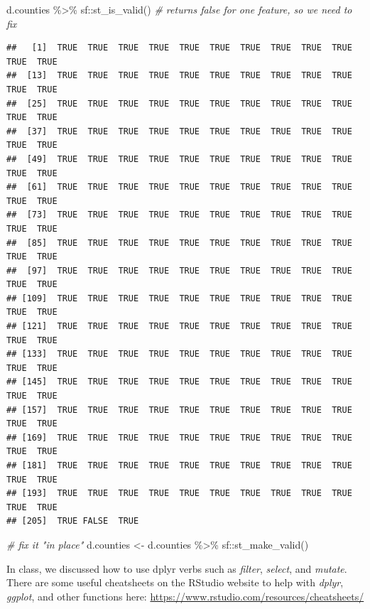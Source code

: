 \documentclass[]{article}
\newenvironment{Shaded}{\begin{snugshade}}{\end{snugshade}}
\newcommand{\CommentTok}[1]{\textcolor[rgb]{0.56,0.35,0.01}{\textit{#1}}}
\newcommand{\FunctionTok}[1]{\textcolor[rgb]{0.00,0.00,0.00}{#1}}
\newcommand{\NormalTok}[1]{#1}
\newcommand{\OtherTok}[1]{\textcolor[rgb]{0.56,0.35,0.01}{#1}}
\newcommand{\SpecialCharTok}[1]{\textcolor[rgb]{0.00,0.00,0.00}{#1}}
\begin{document}
\begin{Shaded}
\begin{Highlighting}[]
\NormalTok{d.counties }\SpecialCharTok{\%\textgreater{}\%}\NormalTok{ sf}\SpecialCharTok{::}\FunctionTok{st\_is\_valid}\NormalTok{() }\CommentTok{\# returns false for one feature, so we need to fix}
\end{Highlighting}
\end{Shaded}

\begin{verbatim}
##   [1]  TRUE  TRUE  TRUE  TRUE  TRUE  TRUE  TRUE  TRUE  TRUE  TRUE  TRUE  TRUE
##  [13]  TRUE  TRUE  TRUE  TRUE  TRUE  TRUE  TRUE  TRUE  TRUE  TRUE  TRUE  TRUE
##  [25]  TRUE  TRUE  TRUE  TRUE  TRUE  TRUE  TRUE  TRUE  TRUE  TRUE  TRUE  TRUE
##  [37]  TRUE  TRUE  TRUE  TRUE  TRUE  TRUE  TRUE  TRUE  TRUE  TRUE  TRUE  TRUE
##  [49]  TRUE  TRUE  TRUE  TRUE  TRUE  TRUE  TRUE  TRUE  TRUE  TRUE  TRUE  TRUE
##  [61]  TRUE  TRUE  TRUE  TRUE  TRUE  TRUE  TRUE  TRUE  TRUE  TRUE  TRUE  TRUE
##  [73]  TRUE  TRUE  TRUE  TRUE  TRUE  TRUE  TRUE  TRUE  TRUE  TRUE  TRUE  TRUE
##  [85]  TRUE  TRUE  TRUE  TRUE  TRUE  TRUE  TRUE  TRUE  TRUE  TRUE  TRUE  TRUE
##  [97]  TRUE  TRUE  TRUE  TRUE  TRUE  TRUE  TRUE  TRUE  TRUE  TRUE  TRUE  TRUE
## [109]  TRUE  TRUE  TRUE  TRUE  TRUE  TRUE  TRUE  TRUE  TRUE  TRUE  TRUE  TRUE
## [121]  TRUE  TRUE  TRUE  TRUE  TRUE  TRUE  TRUE  TRUE  TRUE  TRUE  TRUE  TRUE
## [133]  TRUE  TRUE  TRUE  TRUE  TRUE  TRUE  TRUE  TRUE  TRUE  TRUE  TRUE  TRUE
## [145]  TRUE  TRUE  TRUE  TRUE  TRUE  TRUE  TRUE  TRUE  TRUE  TRUE  TRUE  TRUE
## [157]  TRUE  TRUE  TRUE  TRUE  TRUE  TRUE  TRUE  TRUE  TRUE  TRUE  TRUE  TRUE
## [169]  TRUE  TRUE  TRUE  TRUE  TRUE  TRUE  TRUE  TRUE  TRUE  TRUE  TRUE  TRUE
## [181]  TRUE  TRUE  TRUE  TRUE  TRUE  TRUE  TRUE  TRUE  TRUE  TRUE  TRUE  TRUE
## [193]  TRUE  TRUE  TRUE  TRUE  TRUE  TRUE  TRUE  TRUE  TRUE  TRUE  TRUE  TRUE
## [205]  TRUE FALSE  TRUE
\end{verbatim}

\begin{Shaded}
\begin{Highlighting}[]
\CommentTok{\# fix it "in place"}
\NormalTok{d.counties }\OtherTok{\textless{}{-}}\NormalTok{ d.counties }\SpecialCharTok{\%\textgreater{}\%}\NormalTok{ sf}\SpecialCharTok{::}\FunctionTok{st\_make\_valid}\NormalTok{()}
\end{Highlighting}
\end{Shaded}

In class, we discussed how to use dplyr verbs such as \emph{filter},
\emph{select}, and \emph{mutate}. There are some useful cheatsheets on
the RStudio website to help with \emph{dplyr}, \emph{ggplot}, and other
functions here: \url{https://www.rstudio.com/resources/cheatsheets/}
\end{document}
